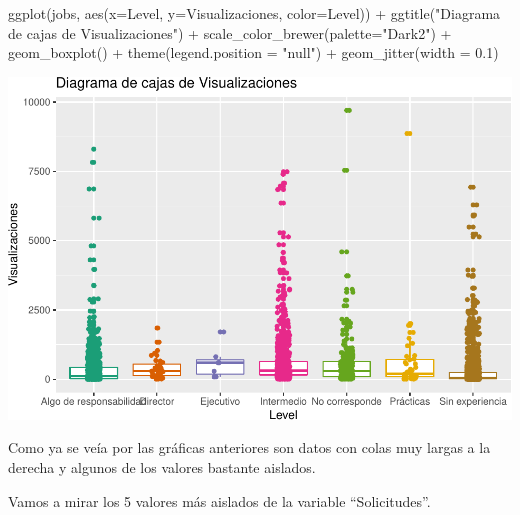 \documentclass[
]{article}
\newenvironment{Shaded}{\begin{snugshade}}{\end{snugshade}}
\newcommand{\DataTypeTok}[1]{\textcolor[rgb]{0.87,0.87,0.75}{#1}}
\newcommand{\DecValTok}[1]{\textcolor[rgb]{0.86,0.86,0.80}{#1}}
\newcommand{\FloatTok}[1]{\textcolor[rgb]{0.75,0.75,0.82}{#1}}
\newcommand{\KeywordTok}[1]{\textcolor[rgb]{0.94,0.87,0.69}{#1}}
\newcommand{\NormalTok}[1]{\textcolor[rgb]{0.80,0.80,0.80}{#1}}
\newcommand{\OperatorTok}[1]{\textcolor[rgb]{0.94,0.94,0.82}{#1}}
\newcommand{\StringTok}[1]{\textcolor[rgb]{0.80,0.58,0.58}{#1}}
\begin{document}
\begin{Shaded}
\begin{Highlighting}[]
\KeywordTok{ggplot}\NormalTok{(jobs, }\KeywordTok{aes}\NormalTok{(}\DataTypeTok{x=}\NormalTok{Level, }\DataTypeTok{y=}\NormalTok{Visualizaciones, }\DataTypeTok{color=}\NormalTok{Level)) }\OperatorTok{+}\StringTok{ }
\StringTok{  }\KeywordTok{ggtitle}\NormalTok{(}\StringTok{"Diagrama de cajas de Visualizaciones"}\NormalTok{) }\OperatorTok{+}\StringTok{ }
\StringTok{  }\KeywordTok{scale\_color\_brewer}\NormalTok{(}\DataTypeTok{palette=}\StringTok{"Dark2"}\NormalTok{) }\OperatorTok{+}
\StringTok{  }\KeywordTok{geom\_boxplot}\NormalTok{() }\OperatorTok{+}
\StringTok{  }\KeywordTok{theme}\NormalTok{(}\DataTypeTok{legend.position =} \StringTok{"null"}\NormalTok{) }\OperatorTok{+}
\StringTok{  }\KeywordTok{geom\_jitter}\NormalTok{(}\DataTypeTok{width =} \FloatTok{0.1}\NormalTok{)}
\end{Highlighting}
\end{Shaded}

\includegraphics{data_cleaning_files/figure-latex/unnamed-chunk-18-2.pdf}

Como ya se veía por las gráficas anteriores son datos con colas muy
largas a la derecha y algunos de los valores bastante aislados.

Vamos a mirar los 5 valores más aislados de la variable ``Solicitudes''.

\begin{Shaded}
\end{Shaded}
\end{document}
